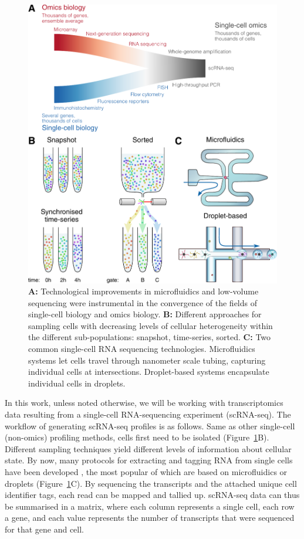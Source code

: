 \begin{figure}[htb!]
	\centering
	\includegraphics[width=.7\linewidth]{fig/scomics_2.pdf} 
	\caption{
		\textbf{A:} Technological improvements in microfluidics and low-volume sequencing were instrumental in the convergence of the fields of single-cell biology and omics biology.
		\textbf{B:} Different approaches for sampling cells with decreasing levels of cellular heterogeneity within the different sub-populations: snapshot, time-series, sorted.
		\textbf{C:} Two common single-cell RNA sequencing technologies. Microfluidics systems let cells travel through nanometer scale tubing, capturing individual cells at intersections. Droplet-based systems encapsulate individual cells in droplets.
	}
	\label{fig:profiling_convergence}
\end{figure}


In this work, unless noted otherwise, we will be working with transcriptomics data resulting from a single-cell RNA-sequencing experiment (scRNA-seq). The workflow of generating scRNA-seq profiles is as follows. Same as other single-cell (non-omics) profiling methods, cells first need to be isolated (Figure~\ref{fig:profiling_convergence}B). Different sampling techniques yield different levels of information about cellular state. By now, many protocols for extracting and tagging RNA from single cells have been developed \cite{svensson_exponentialscalingsinglecell_2018}, the most popular of which are based on microfluidics or droplets (Figure~\ref{fig:profiling_convergence}C). By sequencing the transcripts and the attached unique cell identifier tags, each read can be mapped and tallied up. scRNA-seq data can thus be summarised in a matrix, where each column represents a single cell, each row a gene, and each value represents the number of transcripts that were sequenced for that gene and cell.

